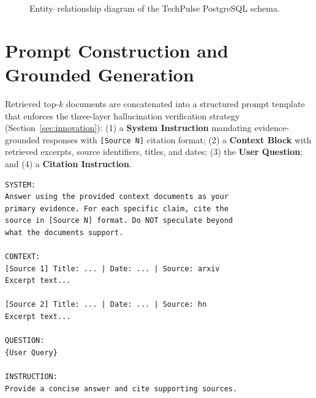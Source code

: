 \begin{figure}[H]
{%
}
\caption{Entity--relationship diagram of the TechPulse PostgreSQL schema.}
\label{fig:er_diagram}
\end{figure}

\section{Prompt Construction and Grounded Generation}
\label{sec:prompt_ch4}

Retrieved top-$k$ documents are concatenated into a structured prompt template that enforces the three-layer hallucination verification strategy (Section~\ref{sec:innovation}): (1) a \textbf{System Instruction} mandating evidence-grounded responses with \texttt{[Source N]} citation format; (2) a \textbf{Context Block} with retrieved excerpts, source identifiers, titles, and dates; (3) the \textbf{User Question}; and (4) a \textbf{Citation Instruction}.

\begin{lstlisting}[caption={Implemented Structured Generation Prompt Template.}, label={lst:prompt}]
SYSTEM:
Answer using the provided context documents as your
primary evidence. For each specific claim, cite the
source in [Source N] format. Do NOT speculate beyond
what the documents support.

CONTEXT:
[Source 1] Title: ... | Date: ... | Source: arxiv
Excerpt text...

[Source 2] Title: ... | Date: ... | Source: hn
Excerpt text...

QUESTION:
{User Query}

INSTRUCTION:
Provide a concise answer and cite supporting sources.
\end{lstlisting}

